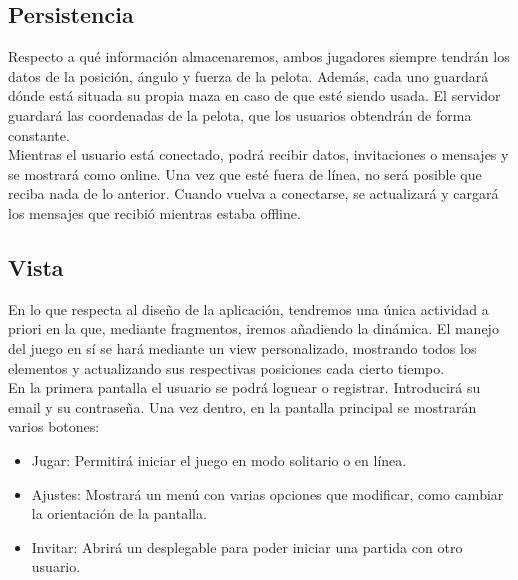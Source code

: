 \documentclass[a4paper,openright,12pt]{article}
\begin{document}
\subsection{Persistencia}
Respecto a qué información almacenaremos, ambos jugadores siempre tendrán los datos de la posición, ángulo y fuerza de la pelota. Además, cada uno guardará dónde está situada su propia maza en caso de que esté siendo usada. El servidor guardará las coordenadas de la pelota, que los usuarios obtendrán de forma constante. \\
Mientras el usuario está conectado, podrá recibir datos, invitaciones o mensajes y se mostrará como online. Una vez que esté fuera de línea, no será posible que reciba nada de lo anterior. Cuando vuelva a conectarse, se actualizará y cargará los mensajes que recibió mientras estaba offline.

\subsection{Vista}
En lo que respecta al diseño de la aplicación, tendremos una única actividad a priori en la que, mediante fragmentos, iremos añadiendo la dinámica. El manejo del juego en sí se hará mediante un view personalizado, mostrando todos los elementos y actualizando sus respectivas posiciones cada cierto tiempo. \\
En la primera pantalla el usuario se podrá loguear o registrar. Introducirá su email y su contraseña. Una vez dentro, en la pantalla principal se mostrarán varios botones: 
\begin{itemize}
    \item Jugar: Permitirá iniciar el juego en modo solitario o en línea.
    \item Ajustes: Mostrará un menú con varias opciones que modificar, como cambiar la orientación de la pantalla.
    \item Invitar: Abrirá un desplegable para poder iniciar una partida con otro usuario.
\end{itemize}
\end{document}
